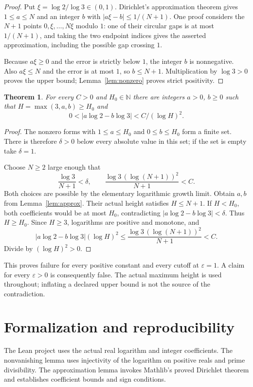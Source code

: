 \documentclass[11pt]{article}
\newtheorem{theorem}{Theorem}
\begin{document}
\newpage
\begin{proof}
Put $\xi=\log2/\log3\in(0,1)$. Dirichlet's approximation
theorem gives $1\leq a\leq N$ and an integer $b$ with
$|a\xi-b|\leq1/(N+1)$. One proof considers the $N+1$ points
$0,\xi,\ldots,N\xi$ modulo $1$: one of their circular gaps
is at most $1/(N+1)$, and taking the two endpoint indices
gives the asserted approximation, including the possible
gap crossing $1$.

Because $a\xi\geq0$ and the error is strictly below $1$,
the integer $b$ is nonnegative. Also $a\xi\leq N$ and the
error is at most $1$, so $b\leq N+1$. Multiplication by
$\log3>0$ proves the upper bound; Lemma~\ref{lem:nonzero}
proves strict positivity.
\end{proof}

\begin{theorem}
For every $C>0$ and $H_0\in\mathbb N$ there are integers
$a>0$, $b\geq0$ such that $H=\max(3,a,b)\geq H_0$ and
\[
 0<|a\log2-b\log3|<C/(\log H)^2.
\]
\end{theorem}
\begin{proof}
The nonzero forms with $1\leq a\leq H_0$ and
$0\leq b\leq H_0$ form a finite set. There is therefore
$\delta>0$ below every absolute value in this set; if the
set is empty take $\delta=1$.

Choose $N\geq2$ large enough that
\[
 \frac{\log3}{N+1}<\delta,\qquad
 \frac{\log3\,(\log(N+1))^2}{N+1}<C.
\]
Both choices are possible by the elementary logarithmic
growth limit. Obtain $a,b$ from Lemma~\ref{lem:approx}.
Their actual height satisfies $H\leq N+1$. If $H<H_0$,
both coefficients would be at most $H_0$, contradicting
$|a\log2-b\log3|<\delta$. Thus $H\geq H_0$.
Since $H\geq3$, logarithms are positive and monotone, and
\[
 |a\log2-b\log3|(\log H)^2
 \leq \frac{\log3\,(\log(N+1))^2}{N+1}<C.
\]
Divide by $(\log H)^2>0$.
\end{proof}

This proves failure for every positive constant and every
cutoff at $\varepsilon=1$. A claim for every
$\varepsilon>0$ is consequently false. The actual maximum
height is used throughout; inflating a declared upper bound
is not the source of the contradiction.

\newpage
\section*{Formalization and reproducibility}
The Lean project uses the actual real logarithm and integer
coefficients. The nonvanishing lemma uses injectivity of
the logarithm on positive reals and prime divisibility.
The approximation lemma invokes Mathlib's proved Dirichlet
theorem and establishes coefficient bounds and sign conditions.
\end{document}
